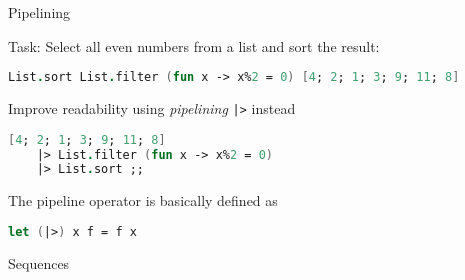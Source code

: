\documentclass{beamer}
\newcommand{\Blue}[1]{\color{blue}#1\color{black}\xspace}
\begin{document}
\begin{frame}[fragile]{Pipelining}

\Blue{Task:} Select all even numbers from a list and sort the result:

\pause

\begin{lstlisting}[language=FSharp]
  List.sort List.filter (fun x -> x%2 = 0) [4; 2; 1; 3; 9; 11; 8]
\end{lstlisting}

\pause\bigskip

Improve readability using \emph{pipelining} \lstinline!|>! instead 

\begin{lstlisting}[language=FSharp]
  [4; 2; 1; 3; 9; 11; 8] 
    |> List.filter (fun x -> x%2 = 0) 
    |> List.sort ;;
\end{lstlisting}

\pause\bigskip

The pipeline operator is basically defined as

\begin{lstlisting}[language=FSharp]
  let (|>) x f = f x 
\end{lstlisting}
\end{frame}

\begin{frame}{Sequences}
\end{frame}


\end{document}
